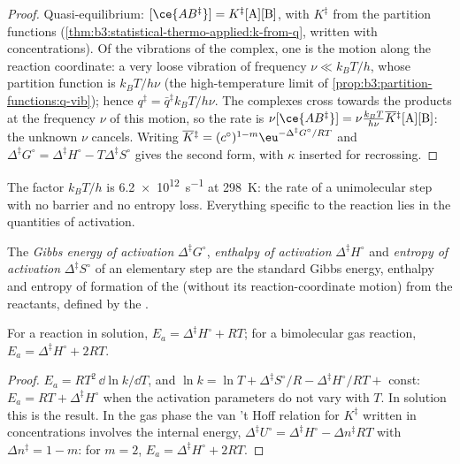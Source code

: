 \begin{proof}
Quasi-equilibrium: $[\ce{AB^{\ddagger}}] = K^{\ddagger}[\mathrm A][\mathrm B]$, with $K^{\ddagger}$ from the partition functions
(\cref{thm:b3:statistical-thermo-applied:k-from-q}, written with concentrations).
Of the vibrations of the complex, one is the motion along the reaction
coordinate: a very loose vibration of frequency $\nu \ll k_BT/h$, whose partition
function is $k_BT/h\nu$ (the high-temperature limit of
\cref{prop:b3:partition-functions:q-vib}); hence $q^{\ddagger} = \bar q^{\ddagger}k_BT/h\nu$. The
complexes cross towards the products at the frequency $\nu$ of this motion, so the
rate is $\nu[\ce{AB^{\ddagger}}] = \nu\frac{k_BT}{h\nu}\overline{K}{}^{\ddagger}[\mathrm A][\mathrm B]$: the unknown $\nu$ cancels. Writing
$\overline{K}{}^{\ddagger} = (c^\circ)^{1-m}\eu^{-\Delta^{\ddagger}G^\circ/RT}$ and $\Delta^{\ddagger}G^\circ = \Delta^{\ddagger}H^\circ - T\Delta^{\ddagger}S^\circ$ gives the
second form, with $\kappa$ inserted for recrossing.
\end{proof}

The factor $k_BT/h$ is \qty{6.2e12}{s^{-1}} at \qty{298}{K}: the rate of a unimolecular step
with no barrier and no entropy loss. Everything specific to the reaction lies
in the quantities of activation.

\begin{definition}\label{def:b3:rate-theories:activation}
The \emph{Gibbs energy of activation}
$\Delta^{\ddagger}G^\circ$, \emph{enthalpy of activation} $\Delta^{\ddagger}H^\circ$ and
\emph{entropy of activation} $\Delta^{\ddagger}S^\circ$ of an elementary
step are the standard Gibbs energy, enthalpy and entropy of formation of the
 (without its reaction-coordinate motion) from the reactants,
defined by the .
\end{definition}

\begin{proposition}\label{prop:b3:rate-theories:ea-dh}
For a reaction in solution, $E_a = \Delta^{\ddagger}H^\circ + RT$; for a bimolecular gas reaction,
$E_a = \Delta^{\ddagger}H^\circ + 2RT$.
\end{proposition}

\begin{proof}
$E_a = RT^2\,\dd\ln k/\dd T$, and $\ln k = \ln T + \Delta^{\ddagger}S^\circ/R - \Delta^{\ddagger}H^\circ/RT + $ const: $E_a =
RT + \Delta^{\ddagger}H^\circ$ when the activation parameters do not vary with $T$. In solution
this is the result. In the gas phase the van 't Hoff relation for $K^{\ddagger}$ written
in concentrations involves the internal energy, $\Delta^{\ddagger}U^\circ = \Delta^{\ddagger}H^\circ - \Delta n^{\ddagger}RT$
with $\Delta n^{\ddagger} = 1 - m$: for $m = 2$, $E_a = \Delta^{\ddagger}H^\circ + 2RT$.
\end{proof}

